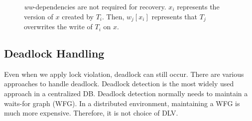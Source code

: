 \documentclass[conference]{IEEEtran}
\begin{document}
\begin{figure}[tbp]
{  }
  \caption{\emph{ww}-dependencies are not required for recovery.
  ${x_i}$ represents the version of $x$ created by ${T_i}$.
 Then, $w_j[x_i]$ represents that ${T_j}$ overwrites the write of ${T_i}$ on $x$.
}
\label{fig:versions_example}
\end{figure}


\subsection {Deadlock Handling}
\label{sec:deadlock_handling}
Even when we apply lock violation, deadlock can still occur.
There are various approaches to handle deadlock.
Deadlock detection is the most widely used approach in a centralized DB.
Deadlock detection normally needs to maintain a waits-for graph (WFG).
In a distributed environment, maintaining a WFG is much more expensive.
Therefore, it is not choice of DLV.
\end{document}
